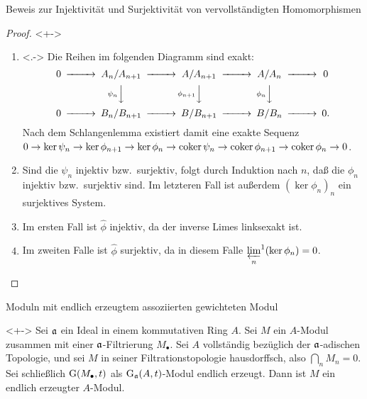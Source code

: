 \begin{frame}{Beweis zur Injektivität und Surjektivität von vervollständigten Homomorphismen}
	\begin{proof}<+->
		\begin{enumerate}[<+->]
		\item<.->
			Die Reihen im folgenden Diagramm sind exakt:
			\[
				\begin{CD}
					0 @>>> A_n/A_{n + 1} @>>> A/A_{n + 1} @>>> A/A_n @>>> 0 \\
					& & @V{\psi_n}VV @V{\phi_{n + 1}}VV @V{\phi_n}VV \\
					0 @>>> B_n/B_{n + 1} @>>> B/B_{n + 1} @>>> B/B_n @>>> 0.
				\end{CD}
			\]
			Nach dem Schlangenlemma existiert damit eine exakte Sequenz
			\(0 \to \ker \psi_n \to \ker \phi_{n + 1} \to \ker \phi_n \to \operatorname{coker} \psi_n \to \operatorname{coker} \phi_{n + 1} \to \operatorname{coker} \phi_n \to 0	
			\).
		\item
			Sind die \(\psi_n\) injektiv bzw.\ surjektiv, folgt durch Induktion nach \(n\), daß die \(\phi_n\) injektiv bzw.\ surjektiv
			sind. Im letzteren Fall ist außerdem \((\ker \phi_n)_n\) ein surjektives System.
		\item
			Im ersten Fall ist \(\hat \phi\) injektiv, da der inverse Limes linksexakt ist.
		\item
			Im zweiten Falle ist \(\hat \phi\) surjektiv, da in diesem Falle \({\varprojlim\limits_n}^1 (\ker \phi_n) = 0\).
			\qedhere
		\end{enumerate}
	\end{proof}
\end{frame}

\begin{frame}{Moduln mit endlich erzeugtem assoziierten gewichteten Modul}
	\begin{proposition}<+->
		\label{prop:weighted_mod_is_ft}
		Sei \(\mathfrak{a}\) ein Ideal in einem kommutativen Ring \(A\). Sei \(M\) ein \(A\)-Modul zusammen mit
		einer \(\mathfrak{a}\)-Filtrierung \(M_\bullet\). Sei \(A\) vollständig bezüglich der \(\mathfrak{a}\)-adischen Topologie,
		und sei \(M\) in seiner Filtrationstopologie hausdorffsch, also \(\bigcap\limits_n M_n = 0\). Sei schließlich
		\(\operatorname{G}(M_\bullet, t)\) als \(\operatorname{G}_{\mathfrak{a}}(A, t)\)-Modul endlich erzeugt. Dann ist \(M\) ein endlich
		erzeugter \(A\)-Modul.
	\end{proposition}
\end{frame}


